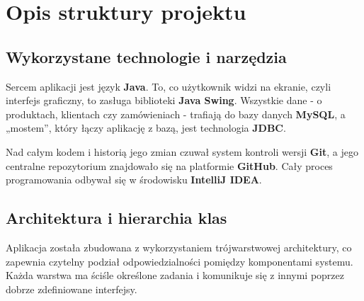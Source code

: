\chapter{Opis struktury projektu}
\label{chap:Opis struktury projektu}

\section{Wykorzystane technologie i narzędzia}
\label{sec:Struktura projektu}
Sercem aplikacji jest język \textbf{Java}. To, co użytkownik widzi na ekranie, czyli interfejs graficzny, to zasługa biblioteki \textbf{Java Swing}. Wszystkie dane - o produktach, klientach czy zamówieniach - trafiają do bazy danych \textbf{MySQL}, a „mostem”, który łączy aplikację z bazą, jest technologia \textbf{JDBC}.

Nad całym kodem i historią jego zmian czuwał system kontroli wersji \textbf{Git}, a jego centralne repozytorium znajdowało się na platformie \textbf{GitHub}. Cały proces programowania odbywał się w środowisku \textbf{IntelliJ IDEA}.

\section{Architektura i hierarchia klas}
Aplikacja została zbudowana z wykorzystaniem trójwarstwowej architektury, co zapewnia czytelny podział odpowiedzialności pomiędzy komponentami systemu. Każda warstwa ma ściśle określone zadania i komunikuje się z innymi poprzez dobrze zdefiniowane interfejsy.

